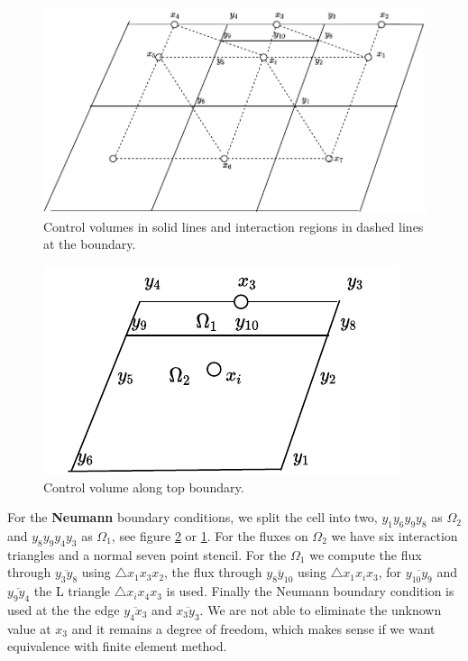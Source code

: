 \documentclass[../Main/main.tex]{subfiles}
\begin{document}
	\begin{figure}[H]
		\centering
		\includegraphics{modified_L_scheme.pdf}
		\caption{Control volumes in solid lines and interaction regions in dashed lines at the boundary.}
		\label{fig:volemes along boundary}
	\end{figure}
	\begin{figure}[H]
		\centering
		\includegraphics{volumepartition.pdf}
		\caption{Control volume along top boundary.}
		\label{fig:volumepartition}
	\end{figure}
	For the \textbf{Neumann} boundary conditions, we split the cell into two, $y_1 y_6 y_9 y_8$ as $\Omega_2$ and $y_8 y_9 y_4 y_3$ as  $\Omega_1$, see figure \ref{fig:volumepartition} or \ref{fig:volemes along boundary}. For the fluxes on $\Omega_2$ we have six interaction triangles and a normal seven point stencil. For the $\Omega_1$ we compute the flux through $\overline{y_3 y_8}$ using $\triangle x_1 x_3 x_2$, the flux through $\overline{y_8 y_{10}}$ using $\triangle x_1 x_i x_3$, for $\overline{y_{10}y_9}$ and $\overline{y_9 y_4}$ the L triangle  $\triangle x_i x_4 x_3$ is used. Finally the Neumann boundary condition is used at the the edge $\overline{y_4 x_3}$ and $\overline{x_3 y_3}$. We are not able to eliminate the unknown value at $x_3$ and it remains a degree of freedom, which makes sense if we want equivalence with finite element method.
\end{document}
